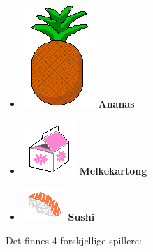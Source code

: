 \documentclass[paper=a4]{article}
\begin{document}
{\renewcommand\labelitemi{}
\begin{itemize}
	\item \includegraphics[scale = 0.3]{images/Ananas.png} \textbf{Ananas}
	\item \includegraphics[scale = 0.4]{images/Melkekartong.png} \textbf{Melkekartong}
	\item \includegraphics[scale = 0.5]{images/Sushi.png} \textbf{Sushi}
\end{itemize}

Det finnes 4 forskjellige spillere:

}
\end{document}
